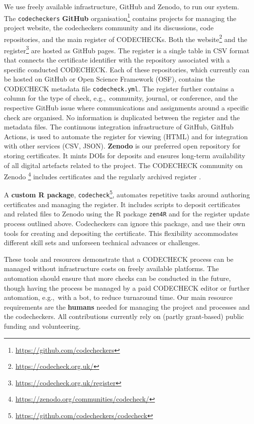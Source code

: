 \documentclass[12pt]{article}
\begin{document}
We use freely available infrastructure, GitHub and Zenodo, to run our
system.  The \texttt{codecheckers} \textbf{GitHub}
organisation\footnote{ \url{https://github.com/codecheckers}} contains
projects for managing the project website, the codecheckers community
and its discussions, code repositories, and the main register of
CODECHECKs. Both the website\footnote{
  \url{https://codecheck.org.uk/}} and the register\footnote{
  \url{https://codecheck.org.uk/register}} are hosted as GitHub
pages. The register is a single table in CSV format that connects the
certificate identifier with the repository associated with a specific
conducted CODECHECK. Each of these repositories, which currently can
be hosted on GitHub or Open Science Framework (OSF), contains the
CODECHECK metadata file \texttt{codecheck.yml}. The register further
contains a column for the type of check, e.g.,~community, journal, or
conference, and the respective GitHub issue where communications and
assignments around a specific check are organised. No information is
duplicated between the register and the metadata files. The continuous
integration infrastructure of GitHub, GitHub Actions, is used to
automate the register for viewing (HTML) and for integration with
other services (CSV, JSON).  \textbf{Zenodo} is our preferred open repository for
storing certificates. It mints DOIs for deposits and ensures
long-term availability of all digital artefacts related to the
project. The CODECHECK community on Zenodo
\footnote{\url{https://zenodo.org/communities/codecheck/}} includes
certificates and the regularly archived register
\cite{codecheck_register_jan2021}.

A \textbf{custom R package}, \texttt{codecheck}\footnote{
  \url{https://github.com/codecheckers/codecheck}}, automates
repetitive tasks around authoring certificates and managing the
register.  It includes scripts to deposit certificates and related
files to Zenodo using the R package \texttt{zen4R} \cite{zen4r} and
for the register update process outlined above.  Codecheckers can
ignore this package, and use their own tools for creating
and depositing the certificate.  This flexibility  accommodates
different skill sets and unforseen technical advances or challenges.

These tools and resources demonstrate that a CODECHECK process can be
managed without infrastructure costs on freely available platforms.
The automation should ensure that more checks can be conducted in the
future, though having the process be managed by a paid CODECHECK
editor or further automation, e.g.,~with a bot, to reduce turnaround
time. Our main resource requirements are the \textbf{humans} needed for managing
the project and processes and the codecheckers.  All contributions
currently rely on (partly grant-based) public funding and
volunteering.
\end{document}

